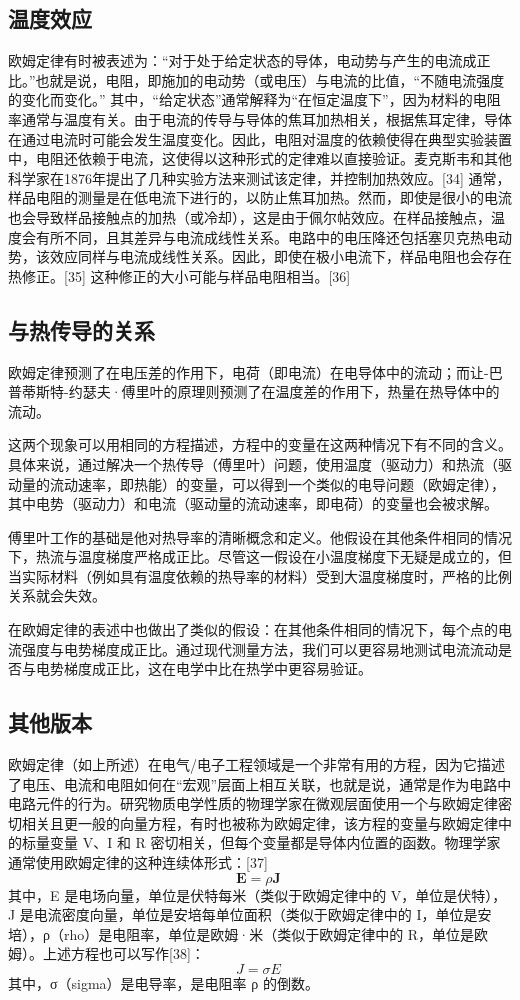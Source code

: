 \subsection{温度效应}  
欧姆定律有时被表述为：“对于处于给定状态的导体，电动势与产生的电流成正比。”也就是说，电阻，即施加的电动势（或电压）与电流的比值，“不随电流强度的变化而变化。” 其中，“给定状态”通常解释为“在恒定温度下”，因为材料的电阻率通常与温度有关。由于电流的传导与导体的焦耳加热相关，根据焦耳定律，导体在通过电流时可能会发生温度变化。因此，电阻对温度的依赖使得在典型实验装置中，电阻还依赖于电流，这使得以这种形式的定律难以直接验证。麦克斯韦和其他科学家在1876年提出了几种实验方法来测试该定律，并控制加热效应。[34] 通常，样品电阻的测量是在低电流下进行的，以防止焦耳加热。然而，即使是很小的电流也会导致样品接触点的加热（或冷却），这是由于佩尔帖效应。在样品接触点，温度会有所不同，且其差异与电流成线性关系。电路中的电压降还包括塞贝克热电动势，该效应同样与电流成线性关系。因此，即使在极小电流下，样品电阻也会存在热修正。[35] 这种修正的大小可能与样品电阻相当。[36]
\subsection{与热传导的关系}  
欧姆定律预测了在电压差的作用下，电荷（即电流）在电导体中的流动；而让-巴普蒂斯特-约瑟夫·傅里叶的原理则预测了在温度差的作用下，热量在热导体中的流动。

这两个现象可以用相同的方程描述，方程中的变量在这两种情况下有不同的含义。具体来说，通过解决一个热传导（傅里叶）问题，使用温度（驱动力）和热流（驱动量的流动速率，即热能）的变量，可以得到一个类似的电导问题（欧姆定律），其中电势（驱动力）和电流（驱动量的流动速率，即电荷）的变量也会被求解。

傅里叶工作的基础是他对热导率的清晰概念和定义。他假设在其他条件相同的情况下，热流与温度梯度严格成正比。尽管这一假设在小温度梯度下无疑是成立的，但当实际材料（例如具有温度依赖的热导率的材料）受到大温度梯度时，严格的比例关系就会失效。

在欧姆定律的表述中也做出了类似的假设：在其他条件相同的情况下，每个点的电流强度与电势梯度成正比。通过现代测量方法，我们可以更容易地测试电流流动是否与电势梯度成正比，这在电学中比在热学中更容易验证。
\subsection{其他版本}  
欧姆定律（如上所述）在电气/电子工程领域是一个非常有用的方程，因为它描述了电压、电流和电阻如何在“宏观”层面上相互关联，也就是说，通常是作为电路中电路元件的行为。研究物质电学性质的物理学家在微观层面使用一个与欧姆定律密切相关且更一般的向量方程，有时也被称为欧姆定律，该方程的变量与欧姆定律中的标量变量 V、I 和 R 密切相关，但每个变量都是导体内位置的函数。物理学家通常使用欧姆定律的这种连续体形式：[37]
\[
\mathbf {E} =\rho \mathbf {J}~
\]
其中，E 是电场向量，单位是伏特每米（类似于欧姆定律中的 V，单位是伏特），J 是电流密度向量，单位是安培每单位面积（类似于欧姆定律中的 I，单位是安培），ρ（rho）是电阻率，单位是欧姆·米（类似于欧姆定律中的 R，单位是欧姆）。上述方程也可以写作[38]：
\[
J = \sigma E~
\]
其中，σ（sigma）是电导率，是电阻率 ρ 的倒数。
